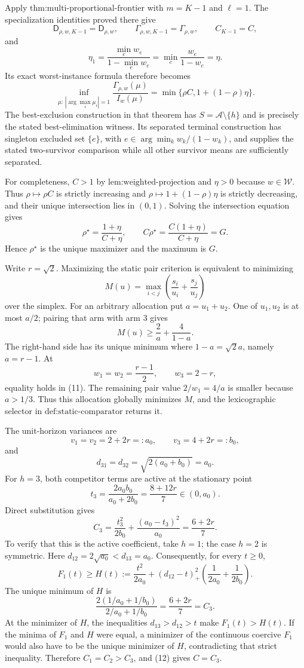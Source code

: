 Apply \(\text{thm:multi-proportional-frontier}\) with \(m=K-1\) and \(\ell=1\). The specialization identities proved there give
\[
 \mathsf D_{\rho,w,K-1}=\mathsf D_{\rho,w},\qquad
 \Gamma_{\rho,w,K-1}=\Gamma_{\rho,w},\qquad
 C_{K-1}=C,
\]
and
\[
 \eta_1=\frac{\min_e w_e}{1-\min_e w_e}
 =\min_e\frac{w_e}{1-w_e}=\eta.
\]
Its exact worst-instance formula therefore becomes
\[
 \inf_{\mu:\,|\arg\max_i\mu_i|=1}
 \frac{\Gamma_{\rho,w}(\mu)}{I_w(\mu)}
 =\min\{\rho C,1+(1-\rho)\eta\}.
\]
The best-exclusion construction in that theorem has \(S=\mathcal A\setminus\{h\}\) and is precisely the stated best-elimination witness. Its separated terminal construction has singleton excluded set \(\{e\}\), with \(e\in\arg\min_k w_k/(1-w_k)\), and supplies the stated two-survivor comparison while all other survivor means are sufficiently separated.

For completeness, \(C>1\) by \(\text{lem:weighted-projection}\) and \(\eta>0\) because \(w\in\mathcal W\). Thus \(\rho\mapsto\rho C\) is strictly increasing and \(\rho\mapsto1+(1-\rho)\eta\) is strictly decreasing, and their unique intersection lies in \((0,1)\). Solving the intersection equation gives
\[
 \rho^\star=\frac{1+\eta}{C+\eta},
 \qquad
 C\rho^\star=\frac{C(1+\eta)}{C+\eta}=G.
\]
Hence \(\rho^\star\) is the unique maximizer and the maximum is \(G\).

Write \(r=\sqrt2\). Maximizing the static pair criterion is equivalent to minimizing
\[
 M(u)=\max_{i<j}\left(\frac{s_i}{u_i}+\frac{s_j}{u_j}\right)
\]
over the simplex. For an arbitrary allocation put \(a=u_1+u_2\). One of \(u_1,u_2\) is at most \(a/2\); pairing that arm with arm \(3\) gives
\[
 M(u)\geq \frac2a+\frac4{1-a}. \tag{11}
\]
The right-hand side has its unique minimum where \(1-a=\sqrt2a\), namely \(a=r-1\). At
\[
 w_1=w_2=\frac{r-1}{2},\qquad w_3=2-r,
\]
equality holds in (11). The remaining pair value \(2/w_1=4/a\) is smaller because \(a>1/3\). Thus this allocation globally minimizes \(M\), and the lexicographic selector in \(\text{def:static-comparator}\) returns it.

The unit-horizon variances are
\[
 v_1=v_2=2+2r=:a_0,\qquad v_3=4+2r=:b_0,
\]
and
\[
 d_{31}=d_{32}=\sqrt{2(a_0+b_0)}=a_0.
\]
For \(h=3\), both competitor terms are active at the stationary point
\[
 t_3=\frac{2a_0b_0}{a_0+2b_0}=\frac{8+12r}{7}\in(0,a_0).
\]
Direct substitution gives
\[
 C_3=\frac{t_3^2}{2b_0}+\frac{(a_0-t_3)^2}{a_0}
 =\frac{6+2r}{7}. \tag{12}
\]
To verify that this is the active coefficient, take \(h=1\); the case \(h=2\) is symmetric. Here \(d_{12}=2\sqrt{a_0}<d_{13}=a_0\). Consequently, for every \(t\geq0\),
\[
 F_1(t)\geq H(t):=\frac{t^2}{2a_0}
 +(d_{12}-t)_+^2\left(\frac1{2a_0}+\frac1{2b_0}\right).
\]
The unique minimum of \(H\) is
\[
 \frac{2(1/a_0+1/b_0)}{2/a_0+1/b_0}
 =\frac{6+2r}{7}=C_3.
\]
At the minimizer of \(H\), the inequalities \(d_{13}>d_{12}>t\) make \(F_1(t)>H(t)\). If the minima of \(F_1\) and \(H\) were equal, a minimizer of the continuous coercive \(F_1\) would also have to be the unique minimizer of \(H\), contradicting that strict inequality. Therefore \(C_1=C_2>C_3\), and (12) gives \(C=C_3\).

